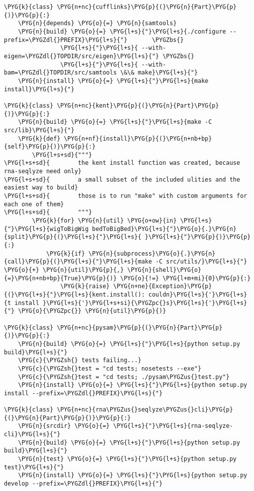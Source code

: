 \begin{Verbatim}[commandchars=\\\{\}]
\PYG{k}{class} \PYG{n+nc}{cufflinks}\PYG{p}{(}\PYG{n}{Part}\PYG{p}{)}\PYG{p}{:}
    \PYG{n}{depends} \PYG{o}{=} \PYG{n}{samtools}
    \PYG{n}{build} \PYG{o}{=} \PYG{l+s}{"}\PYG{l+s}{./configure --prefix=\PYGZdl{}PREFIX}\PYG{l+s}{"}       \PYGZbs{}
                \PYG{l+s}{"}\PYG{l+s}{ --with-eigen=\PYGZdl{}TOPDIR/src/eigen}\PYG{l+s}{"} \PYGZbs{}
                \PYG{l+s}{"}\PYG{l+s}{ --with-bam=\PYGZdl{}TOPDIR/src/samtools \&\& make}\PYG{l+s}{"}
    \PYG{n}{install} \PYG{o}{=} \PYG{l+s}{"}\PYG{l+s}{make install}\PYG{l+s}{"}

\PYG{k}{class} \PYG{n+nc}{kent}\PYG{p}{(}\PYG{n}{Part}\PYG{p}{)}\PYG{p}{:}
    \PYG{n}{build} \PYG{o}{=} \PYG{l+s}{"}\PYG{l+s}{make -C src/lib}\PYG{l+s}{"}
    \PYG{k}{def} \PYG{n+nf}{install}\PYG{p}{(}\PYG{n+nb+bp}{self}\PYG{p}{)}\PYG{p}{:}
        \PYG{l+s+sd}{"""}
\PYG{l+s+sd}{        the kent install function was created, because rna-seqlyze need only}
\PYG{l+s+sd}{        a small subset of the included ulities and the easiest way to build}
\PYG{l+s+sd}{        those is to run "make" with custom arguments for each one of them}
\PYG{l+s+sd}{        """}
        \PYG{k}{for} \PYG{n}{util} \PYG{o+ow}{in} \PYG{l+s}{"}\PYG{l+s}{wigToBigWig bedToBigBed}\PYG{l+s}{"}\PYG{o}{.}\PYG{n}{split}\PYG{p}{(}\PYG{l+s}{"}\PYG{l+s}{ }\PYG{l+s}{"}\PYG{p}{)}\PYG{p}{:}
            \PYG{k}{if} \PYG{n}{subprocess}\PYG{o}{.}\PYG{n}{call}\PYG{p}{(}\PYG{l+s}{"}\PYG{l+s}{make -C src/utils/}\PYG{l+s}{"} \PYG{o}{+} \PYG{n}{util}\PYG{p}{,} \PYG{n}{shell}\PYG{o}{=}\PYG{n+nb+bp}{True}\PYG{p}{)} \PYG{o}{!=} \PYG{l+m+mi}{0}\PYG{p}{:}
                \PYG{k}{raise} \PYG{n+ne}{Exception}\PYG{p}{(}\PYG{l+s}{"}\PYG{l+s}{kent.install(): couldn}\PYG{l+s}{'}\PYG{l+s}{t install }\PYG{l+s}{'}\PYG{l+s+si}{\PYGZpc{}s}\PYG{l+s}{'}\PYG{l+s}{"} \PYG{o}{\PYGZpc{}} \PYG{n}{util}\PYG{p}{)}

\PYG{k}{class} \PYG{n+nc}{pysam}\PYG{p}{(}\PYG{n}{Part}\PYG{p}{)}\PYG{p}{:}
    \PYG{n}{build} \PYG{o}{=} \PYG{l+s}{"}\PYG{l+s}{python setup.py build}\PYG{l+s}{"}
    \PYG{c}{\PYGZsh{} tests failing...}
    \PYG{c}{\PYGZsh{}test = "cd tests; nosetests --exe"}
    \PYG{c}{\PYGZsh{}test = "cd tests; ./pysam\PYGZus{}test.py"}
    \PYG{n}{install} \PYG{o}{=} \PYG{l+s}{"}\PYG{l+s}{python setup.py install --prefix=\PYGZdl{}PREFIX}\PYG{l+s}{"}

\PYG{k}{class} \PYG{n+nc}{rna\PYGZus{}seqlyze\PYGZus{}cli}\PYG{p}{(}\PYG{n}{Part}\PYG{p}{)}\PYG{p}{:}
    \PYG{n}{srcdir} \PYG{o}{=} \PYG{l+s}{"}\PYG{l+s}{rna-seqlyze-cli}\PYG{l+s}{"}
    \PYG{n}{build} \PYG{o}{=} \PYG{l+s}{"}\PYG{l+s}{python setup.py build}\PYG{l+s}{"}
    \PYG{n}{test} \PYG{o}{=} \PYG{l+s}{"}\PYG{l+s}{python setup.py test}\PYG{l+s}{"}
    \PYG{n}{install} \PYG{o}{=} \PYG{l+s}{"}\PYG{l+s}{python setup.py develop --prefix=\PYGZdl{}PREFIX}\PYG{l+s}{"}


\end{Verbatim}
